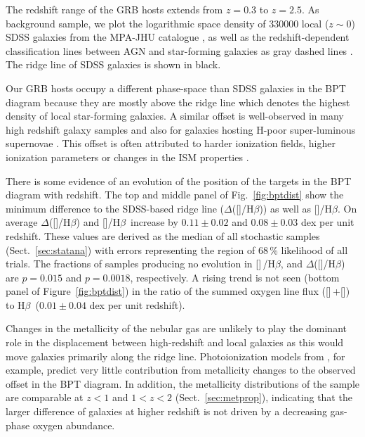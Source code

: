 \documentclass[traditabstract, longauth]{aa}
\newcommand{\hb}{H$\beta$}
\newcommand{\oii}{[\ion{O}{ii}]}
\newcommand{\oiii}{[\ion{O}{iii}]}
\begin{document}
The redshift range of the GRB hosts extends from $z=0.3$ to $z=2.5$. As background sample, we plot the logarithmic space density of 330000 local ($z\sim0$) SDSS \citep{2009ApJS..182..543A} galaxies from the MPA-JHU catalogue \citep[e.g.,][]{2003MNRAS.346.1055K}, as well as the redshift-dependent classification lines between AGN and star-forming galaxies as gray dashed lines \citep{2013ApJ...774L..10K}. The ridge line of SDSS galaxies \citep{2008MNRAS.385..769B} is shown in black.

Our GRB hosts occupy a different phase-space than SDSS galaxies in the BPT diagram because they are mostly above the ridge line which denotes the highest density of local star-forming galaxies. A similar offset is well-observed in many high redshift galaxy samples \citep[e.g.,][]{2005ApJ...635.1006S, 2007ApJ...669..776K, 2014ApJ...795..165S} and also for galaxies hosting H-poor super-luminous supernovae \citep{2014arXiv1409.8331L}. This offset is often attributed to harder ionization fields, higher ionization parameters or changes in the ISM properties \citep[e.g.,][]{2008MNRAS.385..769B, 2013ApJ...774..100K, 2014ApJ...795..165S}. 

 {There is some evidence of an evolution of the position of the targets in the BPT diagram with redshift. The top and middle panel of Fig.~\ref{fig:bptdist} show the minimum difference to the SDSS-based ridge line ($\Delta$(\oiii/\hb)) as well as \oiii/\hb. On average $\Delta$(\oiii/\hb) and \oiii/\hb\, increase by $0.11\pm0.02$ and $0.08\pm0.03$ dex per unit redshift. These values are derived as the median of all stochastic samples (Sect.~\ref{sec:statana}) with errors representing the region of 68\,\% likelihood of all trials. The fractions of samples producing no evolution in \oiii\,/\hb, and $\Delta$(\oiii/\hb) are $p=0.015$ and $p=0.0018$, respectively. A rising trend is not seen (bottom panel of Figure~\ref{fig:bptdist}) in the ratio of the summed oxygen line flux (\oiii\,+\oii)\,to \hb\, ($0.01\pm0.04$ dex per unit redshift).} 

 {Changes in the metallicity of the nebular gas are unlikely to play the dominant role in the displacement between high-redshift and local galaxies as this would move galaxies primarily along the ridge line. Photoionization models from \citet{2014ApJ...795..165S}, for example, predict very little contribution from metallicity changes to the observed offset in the BPT diagram. In addition, the metallicity distributions of the sample are comparable at $z<1$ and $1<z<2$ (Sect.~\ref{sec:metprop}), indicating that the larger difference of galaxies at higher redshift is not driven by a decreasing gas-phase oxygen abundance.}
\end{document}
